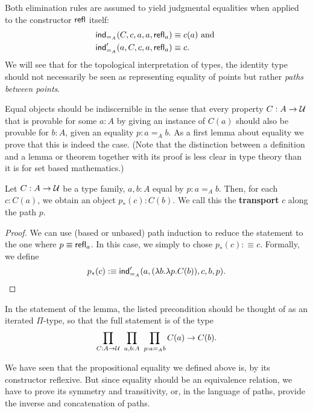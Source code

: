 Both elimination rules are assumed to yield judgmental equalities when applied
to the constructor $\mathsf{refl}$ itself:
\begin{align*}
\mathsf{ind}_{=_A}(C, c, a, a, \mathsf{refl}_a) &\equiv c(a) \text{ and } \\
\mathsf{ind}'_{=_A}(a, C, c, a, \mathsf{refl}_a) &\equiv c \text{.}
\end{align*}
We will see that for the topological interpretation of types, the identity type
should not necessarily be seen as representing equality of points but rather
\emph{paths between points}.

Equal objects should be indiscernible in the sense that every property $C : A \to \mathcal{U}$
that is provable for some $a : A$ by giving an instance of $C(a)$ should also be
provable for $b : A$, given an equality $p : a =_A b$.
As a first lemma about equality we prove that this is indeed the case.
(Note that the distinction between a definition and a lemma or theorem together
with its proof is less clear in type theory than it is for set based mathematics.)

\begin{lemma}[Transport] \label{thm:transport-hott}
Let $C : A \to \mathcal{U}$ be a type family, $a , b : A$ equal by $p : a =_A b$.
Then, for each $c : C(a)$, we obtain an object $p_*(c) : C(b)$.
We call this the \textbf{transport} $c$ along the path $p$.
\end{lemma}

\begin{proof}
We can use (based or unbased) path induction to reduce the statement to the one
where $p \equiv \mathsf{refl}_a$.
In this case, we simply to chose $p_*(c) :\equiv c$.
Formally, we define
\begin{equation*}
p_*(c) :\equiv \mathsf{ind}'_{=_A}(a, (\lambda b. \lambda p. C(b)), c, b, p) \text{.}
\end{equation*}
\end{proof}
In the statement of the lemma, the listed precondition should be thought of as
an iterated $\Pi$-type, so that the full statement is of the type
\begin{equation*}
\prod_{C : A \to \mathcal{U}} ~ \prod_{a, b : A} ~ \prod_{p : a =_A b} C(a) \to C(b) \text{.}
\end{equation*}

We have seen that the propositional equality we defined above is, by its constructor
reflexive.
But since equality should be an equivalence relation, we have to prove its
symmetry and transitivity, or, in the language of paths, provide the inverse and
concatenation of paths.


